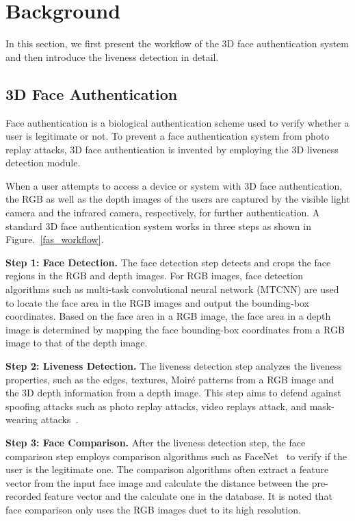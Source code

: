 \section{Background}
\label{sec:background}
In this section, we first present the workflow of the 3D face authentication system and then introduce the liveness detection in detail.

\subsection{3D Face Authentication}
Face authentication is a biological authentication scheme used to verify whether a user is legitimate or not. To prevent a face authentication system from photo replay attacks, 3D face authentication is invented by employing the 3D liveness detection module. 

When a user attempts to access a device or system with 3D face authentication, the RGB as well as the depth images of the users are captured by the visible light camera and the infrared camera, respectively, for further authentication. A standard 3D face authentication system works in three steps as shown in Figure.~\ref{fas_workflow}.

\textbf{Step 1: Face Detection.} 
The face detection step detects and crops the face regions in the RGB and depth images. For RGB images, face detection algorithms such as multi-task convolutional neural network (MTCNN) \cite{zhang2016joint} are used to locate the face area in the RGB images and output the bounding-box coordinates. Based on the face area in a RGB image, the face area in a depth image is determined by mapping the face bounding-box coordinates from a RGB image to that of the depth image.

\textbf{Step 2: Liveness Detection.} The liveness detection step analyzes the liveness properties, such as the edges, textures, Moiré patterns
 from a RGB image and the 3D depth information from a depth image. 
This step aims to defend against spoofing attacks such as photo replay attacks, video replays attack, and mask-wearing attacks~\cite{chakka2011competition,anjos2011counter,raghavendra2015presentation, bhattacharjee2018spoofing, nesli2013spoofing}.

\textbf{Step 3: Face Comparison.} After the liveness detection step, the face comparison step employs comparison algorithms such as FaceNet~\cite{schroff2015facenet} to verify if the user is the legitimate one. The comparison algorithms often extract a feature vector from the input face image and calculate the distance between the pre-recorded feature vector and the calculate one in the database. It is noted that face comparison only uses the RGB images duet to its high resolution.

